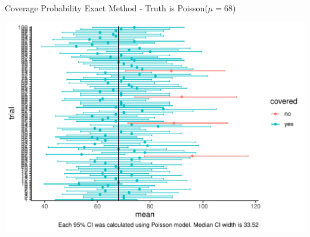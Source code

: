 \documentclass[10pt,handout]{beamer}\usepackage[]{graphicx}\usepackage[]{color}
\makeatletter
\def\maxwidth{ %
  \ifdim\Gin@nat@width>\linewidth
    \linewidth
  \else
    \Gin@nat@width
  \fi
}
\newenvironment{knitrout}{}{} %
\makeatother
\begin{document}
\begin{frame}[fragile]{Coverage Probability Exact Method - Truth is Poisson($\mu=68$)}
	
\begin{knitrout}\tiny
{}\color{fgcolor}

{\centering \includegraphics[width=\maxwidth]{figure/unnamed-chunk-7-1} 

}



\end{knitrout}
	
\end{frame}








\end{document}
